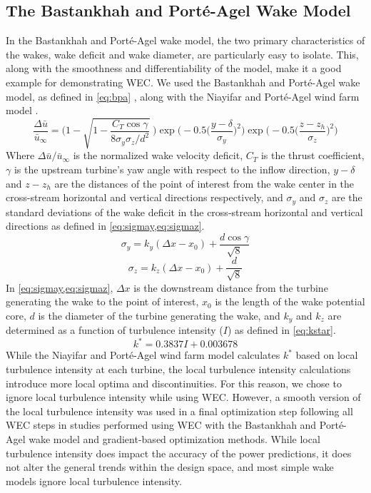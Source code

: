 \documentclass[a4paper]{jpconf}
\begin{document}
\subsection{The Bastankhah and Port\'e-Agel Wake Model}
In the Bastankhah and Port\'e-Agel wake model, the two primary characteristics of the wakes, wake deficit and wake diameter, are particularly easy to isolate. This, along with the smoothness and differentiability of the model, make it a good example for demonstrating WEC. We used the Bastankhah and Port\'e-Agel wake model, as defined in \cref{eq:bpa} \cite{bastankhah2016}, along with the Niayifar and Port\'e-Agel wind farm model \cite{niayifar2016}.
%
\begin{equation}
	\frac{\Delta \bar{u}}{\bar{u}_{\infty}} = \Bigg(1-\sqrt{1-\frac{C_T \cos{\gamma}}{8 \sigma_y \sigma_z/d^2}}~\Bigg) \exp{\bigg(-0.5\Big(\frac{y-\delta}{\sigma_y}\Big)^2\bigg)}\exp{\bigg(-0.5\Big(\frac{z-z_h}{\sigma_z}\Big)^2\bigg)}
	 \label{eq:bpa}
\end{equation}
%
Where $\Delta \bar{u} / \bar{u}_{\infty}$ is the normalized wake velocity deficit, $C_T$ is the thrust coefficient, $\gamma$ is the upstream turbine's yaw angle with respect to the inflow direction, $y-\delta$ and $z-z_h$ are the distances of the point of interest from the wake center in the cross-stream horizontal and vertical directions respectively, and $\sigma_y$ and $\sigma_z$ are the standard deviations of the wake deficit in the cross-stream horizontal and vertical directions as defined in \cref{eq:sigmay,eq:sigmaz}.
%
\begin{equation}\label{eq:sigmay}
	\sigma_y = k_y (\Delta x - x_0) + \frac{d \cos{\gamma}}{\sqrt{8}}
\end{equation}
%
\begin{equation}\label{eq:sigmaz}
	\sigma_z = k_z (\Delta x - x_0) + \frac{d}{\sqrt{8}}
\end{equation}
%
In \cref{eq:sigmay,eq:sigmaz}, $\Delta x$ is the downstream distance from the turbine generating the wake to the point of interest, $x_0$ is the length of the wake potential core, $d$ is the diameter of the turbine generating the wake, and $k_y$ and $k_z$ are determined as a function of turbulence intensity ($I$) as defined in \cref{eq:kstar}\cite{niayifar2016}.
%
\begin{equation}\label{eq:kstar}
	k^* = 0.3837I + 0.003678
\end{equation}
%
While the Niayifar and Port\'e-Agel wind farm model calculates $k^*$ based on local turbulence intensity at each turbine, the local turbulence intensity calculations introduce more local optima and discontinuities. For this reason, we chose to ignore local turbulence intensity while using WEC. However, a smooth version of the local turbulence intensity was used in a final optimization step following all WEC steps in studies performed using WEC with the Bastankhah and Port\'e-Agel wake model and gradient-based optimization methods. While local turbulence intensity does impact the accuracy of the power predictions, it does not alter the general trends within the design space, and most simple wake models ignore local turbulence intensity. 
\end{document}
